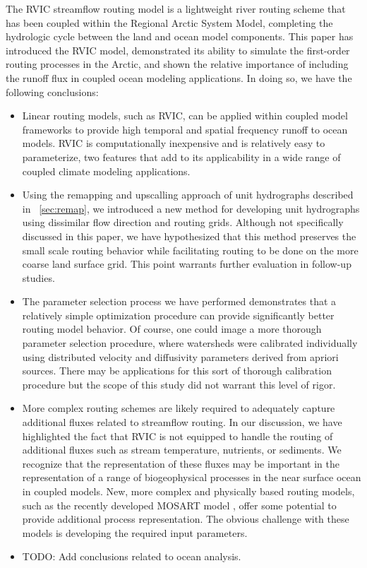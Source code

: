 \documentclass[jgrga, draft]{agutex}
\begin{document}
\begin{article}
The RVIC streamflow routing model is a lightweight river routing scheme that has been coupled within the Regional Arctic System Model, completing the hydrologic cycle between the land and ocean model components.
This paper has introduced the RVIC model, demonstrated its ability to simulate the first-order routing processes in the Arctic, and shown the relative importance of including the runoff flux in coupled ocean modeling applications.
In doing so, we have the following conclusions:
\begin{itemize}
\item Linear routing models, such as RVIC, can be applied within coupled model frameworks to provide high temporal and spatial frequency runoff to ocean models.
RVIC is computationally inexpensive and is relatively easy to parameterize, two features that add to its applicability in a wide range of coupled climate modeling applications.
\item Using the remapping and upscalling approach of unit hydrographs described in ~\ref{sec:remap}, we introduced a new method for developing unit hydrographs using dissimilar flow direction and routing grids.
Although not specifically discussed in this paper, we have hypothesized that this method preserves the small scale routing behavior while facilitating routing to be done on the more coarse land surface grid.
This point warrants further evaluation in follow-up studies.
\item The parameter selection process we have performed demonstrates that a relatively simple optimization procedure can provide significantly better routing model behavior.
Of course, one could image a more thorough parameter selection procedure, where watersheds were calibrated individually using distributed velocity and diffusivity parameters derived from apriori sources.
There may be applications for this sort of thorough calibration procedure but the scope of this study did not warrant this level of rigor.
\item More complex routing schemes are likely required to adequately capture additional fluxes related to streamflow routing.
In our discussion, we have highlighted the fact that RVIC is not equipped to handle the routing of additional fluxes such as stream temperature, nutrients, or sediments.
We recognize that the representation of these fluxes may be important in the representation of a range of biogeophysical processes in the near surface ocean in coupled models.
New, more complex and physically based routing models, such as the recently developed MOSART model \citep{Li_2013}, offer some potential to provide additional process representation.
The obvious challenge with these models is developing the required input parameters.
\item TODO: Add conclusions related to ocean analysis.
\end{itemize}


\end{article}
\end{document}
